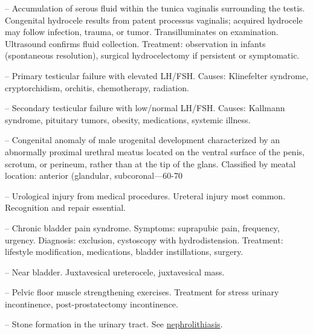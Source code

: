 -- Accumulation of serous fluid within the tunica vaginalis surrounding the testis. Congenital hydrocele results from patent processus vaginalis; acquired hydrocele may follow infection, trauma, or tumor. Transilluminates on examination. Ultrasound confirms fluid collection. Treatment: observation in infants (spontaneous resolution), surgical hydrocelectomy if persistent or symptomatic.

-- Primary testicular failure with elevated LH/FSH. Causes: Klinefelter syndrome, cryptorchidism, orchitis, chemotherapy, radiation.

-- Secondary testicular failure with low/normal LH/FSH. Causes: Kallmann syndrome, pituitary tumors, obesity, medications, systemic illness.

-- Congenital anomaly of male urogenital development characterized by an abnormally proximal urethral meatus located on the ventral surface of the penis, scrotum, or perineum, rather than at the tip of the glans. Classified by meatal location: anterior (glandular, subcoronal—60-70%

-- Urological injury from medical procedures. Ureteral injury most common. Recognition and repair essential.

-- Chronic bladder pain syndrome. Symptoms: suprapubic pain, frequency, urgency. Diagnosis: exclusion, cystoscopy with hydrodistension. Treatment: lifestyle modification, medications, bladder instillations, surgery.

-- Near bladder. Juxtavesical ureterocele, juxtavesical mass.

-- Pelvic floor muscle strengthening exercises. Treatment for stress urinary incontinence, post-prostatectomy incontinence.

-- Stone formation in the urinary tract. See \hyperlink{Nephrolithiasis}{nephrolithiasis}.

